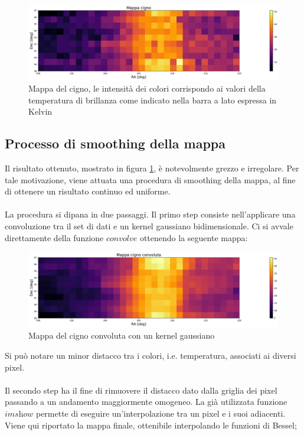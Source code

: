\begin{figure}[H]
	\centering
	\includegraphics[scale=0.4]{Mappa_grezza.pdf}
	\caption{Mappa del cigno, le intensità dei colori corrispondo ai valori della temperatura di brillanza come indicato nella barra a lato espressa in Kelvin}
    	\label{fig:Mappa_grezza}
\end{figure}

\subsection{Processo di smoothing della mappa}

Il risultato ottenuto, mostrato in figura \ref{fig:Mappa_grezza}, è notevolmente grezzo e irregolare. Per tale motivazione, viene attuata una procedura di smoothing della mappa, al fine di ottenere un risultato continuo ed uniforme.
\\\\
La procedura si dipana in due passaggi. Il primo step consiste nell'applicare una convoluzione tra il set di dati e un kernel gaussiano bidimensionale. Ci si avvale direttamente della funzione $\textit{convolve}$ ottenendo la seguente mappa:

\begin{figure}[H]
	\centering
	\includegraphics[scale=0.4]{Mappa_convolve.pdf}
	\caption{Mappa del cigno convoluta con un kernel gaussiano}
    	\label{fig:Mappa_convolve}
\end{figure}

Si può notare un minor distacco tra i colori, i.e. temperatura, associati ai diversi pixel.
\\\\
Il secondo step ha il fine di rimuovere il distacco dato dalla griglia dei pixel passando a un andamento maggiormente omogeneo. La già utilizzata funzione $\textit{imshow}$ permette di eseguire un'interpolazione tra un pixel e i suoi adiacenti. Viene qui riportato la mappa finale, ottenibile interpolando le funzioni di Bessel; 

